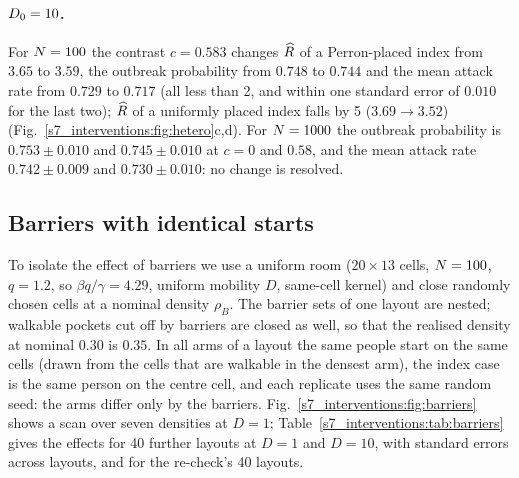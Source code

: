 \paragraph{$D_0=10$.} For $N=100$ the contrast $c=0.583$ changes $\widehat{R}$ of a Perron-placed index from $3.65$ to
$3.59$, the outbreak probability from $0.748$ to $0.744$ and the mean attack rate from $0.729$ to $0.717$
(all less than 2\pct, and within one standard error of $0.010$ for the last two); $\widehat{R}$ of a uniformly
placed index falls by 5\pct{} ($3.69\to3.52$) (Fig.~\ref{s7_interventions:fig:hetero}c,d). For $N=1000$
the outbreak probability is $0.753\pm0.010$ and $0.745\pm0.010$ at $c=0$ and $0.58$, and the mean attack rate
$0.742\pm0.009$ and $0.730\pm0.010$: no change is resolved.

\subsection{Barriers with identical starts}\label{s7_interventions:sec:barriers}

To isolate the effect of barriers we use a uniform room ($20\times13$ cells, $N=100$, $q=1.2$, so
$\beta q/\gamma=4.29$, uniform mobility $D$, same-cell kernel) and close randomly chosen cells at a nominal
density $\rho_B$. The barrier sets of one layout are nested; walkable pockets cut off by barriers are closed
as well, so that the realised density at nominal $0.30$ is $0.35$. In all arms of a layout the same people
start on the same cells (drawn from the cells that are walkable in the densest arm), the index case is the
same person on the centre cell, and each replicate uses the same random seed: the arms differ only by the
barriers. Fig.~\ref{s7_interventions:fig:barriers} shows a scan over seven
densities at $D=1$; Table~\ref{s7_interventions:tab:barriers} gives the
effects for 40 further layouts at $D=1$ and $D=10$, with standard errors across layouts, and for the
re-check's 40 layouts.


